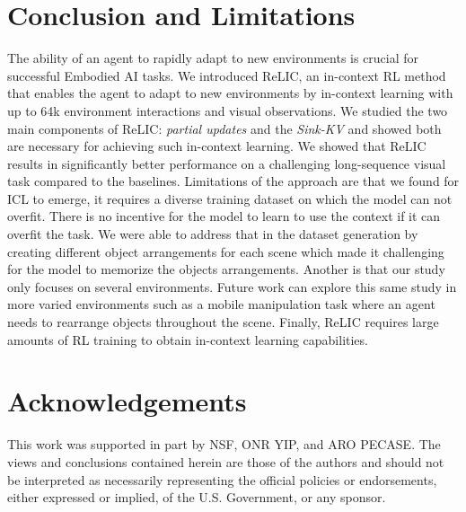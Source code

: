 \documentclass{article}
\newcommand{\method}{ReLIC\xspace}
\newcommand{\sinkv}{Sink-KV\xspace}
\begin{document}
\section{Conclusion and Limitations}
  \vspace{-10pt}
 The ability of an agent to rapidly adapt to new environments is crucial for successful Embodied AI tasks. We introduced \method, an in-context RL method that enables the agent to adapt to new environments by in-context learning with up to 64k environment interactions and visual observations. We studied the two main components of \method: \textit{partial updates} and the \textit{\sinkv} and showed both are necessary for achieving such in-context learning.
We showed that \method results in significantly better performance on a challenging long-sequence visual task compared to the baselines.
Limitations of the approach are that we found for ICL to emerge, it requires a diverse training dataset on which the model can not overfit. There is no incentive for the model to learn to use the context if it can overfit the task. We were able to address that in the dataset generation by creating different object arrangements for each scene which made it challenging for the model to memorize the objects arrangements.
Another is that our study only focuses on several environments.
Future work can explore this same study in more varied environments such as a mobile manipulation task where an agent needs to rearrange objects throughout the scene.
Finally, \method requires large amounts of RL training to obtain in-context learning capabilities.
\section{Acknowledgements}
This work was supported in part by NSF, ONR YIP, and ARO PECASE. The views and conclusions contained herein are those of the authors and should not be interpreted as necessarily representing the official policies or endorsements, either expressed or implied, of the U.S. Government, or any sponsor.


\appendix
\newpage
\end{document}
